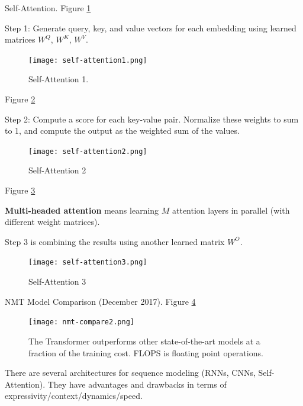\documentclass[english]{article}
\begin{document}
\item 
 {Self-Attention}.  Figure \ref{Self-Attention 1}

Step 1: Generate query, key, and value vectors for each embedding using learned matrices $W^Q$, $W^K$, $W^V$.
\begin{figure}
\centering
\texttt{[image: self-attention1.png]}
    \caption{Self-Attention 1.}
    \label{Self-Attention 1}
\end{figure}
 


\item  Figure \ref{Self-Attention 2}

Step 2: Compute a score for each key-value pair. Normalize these weights to sum to 1, and compute the output as the weighted sum of the values.
\begin{figure}
\centering
\texttt{[image: self-attention2.png]}
    \caption{Self-Attention 2}
    \label{Self-Attention 2}
\end{figure}
 

\item  Figure \ref{Self-Attention 3}

\textbf{Multi-headed attention} means learning $M$ attention layers in parallel (with different weight matrices).

Step 3 is combining the results using another learned matrix $W^O$.
\begin{figure}
\centering
\texttt{[image: self-attention3.png]}
    \caption{Self-Attention 3}
    \label{Self-Attention 3}
\end{figure} 
 

\item 
 {NMT Model Comparison (December 2017)}.  Figure \ref{TheT}

\begin{figure}
\centering
\texttt{[image: nmt-compare2.png]}
\caption{The Transformer outperforms other state-of-the-art models at a fraction of the training cost. FLOPS is floating point operations.}
\label{TheT}
\end{figure}
 

\item There are several architectures for sequence modeling (RNNs, CNNs, Self-Attention). They have advantages and drawbacks in terms of expressivity/context/dynamics/speed.
\end{document}
